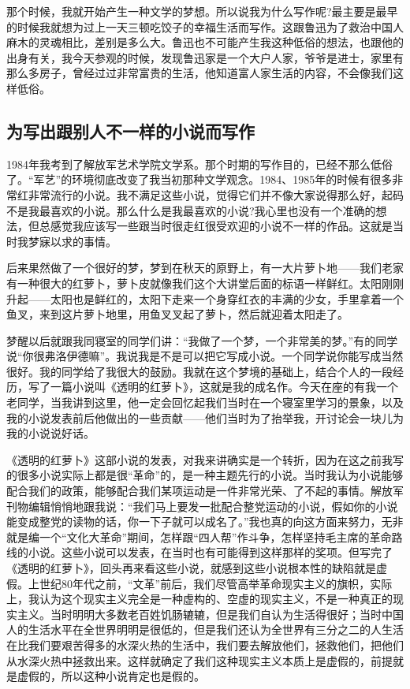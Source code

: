 \documentclass[12pt,a5paper]{ctexbook}
\begin{document}
那个时候，我就开始产生一种文学的梦想。所以说我为什么写作呢?最主要是最早的时候我就想为过上一天三顿吃饺子的幸福生活而写作。这跟鲁迅为了救治中国人麻木的灵魂相比，差别是多么大。鲁迅也不可能产生我这种低俗的想法，也跟他的出身有关，我今天参观的时候，发现鲁迅家是一个大户人家，爷爷是进士，家里有那么多房子，曾经过过非常富贵的生活，他知道富人家生活的内容，不会像我们这样低俗。

\subsection{为写出跟别人不一样的小说而写作}

1984年我考到了解放军艺术学院文学系。那个时期的写作目的，已经不那么低俗了。“军艺”的环境彻底改变了我当初那种文学观念。1984、1985年的时候有很多非常红非常流行的小说。我不满足这些小说，觉得它们并不像大家说得那么好，起码不是我最喜欢的小说。那么什么是我最喜欢的小说?我心里也没有一个准确的想法，但总感觉我应该写一些跟当时很走红很受欢迎的小说不一样的作品。这就是当时我梦寐以求的事情。

后来果然做了一个很好的梦，梦到在秋天的原野上，有一大片萝卜地——我们老家有一种很大的红萝卜，萝卜皮就像我们这个大讲堂后面的标语一样鲜红。太阳刚刚升起——太阳也是鲜红的，太阳下走来一个身穿红衣的丰满的少女，手里拿着一个鱼叉，来到这片萝卜地里，用鱼叉叉起了萝卜，然后就迎着太阳走了。

梦醒以后就跟我同寝室的同学们讲：“我做了一个梦，一个非常美的梦。”有的同学说“你很弗洛伊德嘛”。我说我是不是可以把它写成小说。一个同学说你能写成当然很好。我的同学给了我很大的鼓励。我就在这个梦境的基础上，结合个人的一段经历，写了一篇小说叫《透明的红萝卜》，这就是我的成名作。今天在座的有我一个老同学，当我讲到这里，他一定会回忆起我们当时在一个寝室里学习的景象，以及我的小说发表前后他做出的一些贡献——他们当时为了抬举我，开讨论会一块儿为我的小说说好话。

《透明的红萝卜》这部小说的发表，对我来讲确实是一个转折，因为在这之前我写的很多小说实际上都是很“革命”的，是一种主题先行的小说。当时我认为小说能够配合我们的政策，能够配合我们某项运动是一件非常光荣、了不起的事情。解放军刊物编辑悄悄地跟我说：“我们马上要发一批配合整党运动的小说，假如你的小说能变成整党的读物的话，你一下子就可以成名了。”我也真的向这方面来努力，无非就是编一个“文化大革命”期间，怎样跟“四人帮”作斗争，怎样坚持毛主席的革命路线的小说。这些小说可以发表，在当时也有可能得到这样那样的奖项。但写完了《透明的红萝卜》，回头再来看这些小说，就感到这些小说根本性的缺陷就是虚假。上世纪80年代之前，“文革”前后，我们尽管高举革命现实主义的旗帜，实际上，我认为这个现实主义完全是一种虚构的、空虚的现实主义，不是一种真正的现实主义。当时明明大多数老百姓饥肠辘辘，但是我们自认为生活得很好；当时中国人的生活水平在全世界明明是很低的，但是我们还认为全世界有三分之二的人生活在比我们要艰苦得多的水深火热的生活中，我们要去解放他们，拯救他们，把他们从水深火热中拯救出来。这样就确定了我们这种现实主义本质上是虚假的，前提就是虚假的，所以这种小说肯定也是假的。
\end{document}
